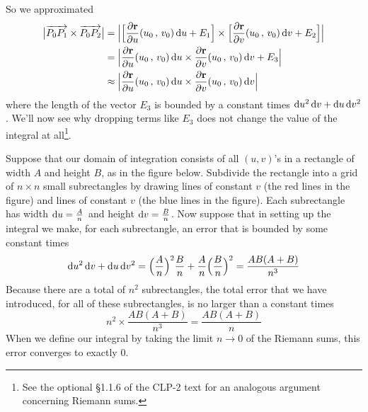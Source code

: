 So we approximated
\begin{align*}
\big|\overrightarrow{P_0P_1}\times\overrightarrow{P_0P_2}\big|
&=\Big|\Big[\frac{\partial\mathbf{r}}{\partial u}(u_0\,,\,v_0)\,\mathrm{d}u + E_1\Big]
\times\Big[\frac{\partial\mathbf{r}}{\partial v}(u_0\,,\,v_0)\,\mathrm{d}v + E_2\Big]
\Big| \\
&=\Big|\frac{\partial\mathbf{r}}{\partial u}(u_0\,,\,v_0)\,\mathrm{d}u 
\times\frac{\partial\mathbf{r}}{\partial v}(u_0\,,\,v_0)\,\mathrm{d}v + E_3
\Big| \\
&\approx \Big|\frac{\partial\mathbf{r}}{\partial u}(u_0\,,\,v_0)\,\mathrm{d}u 
\times\frac{\partial\mathbf{r}}{\partial v}(u_0\,,\,v_0)\,\mathrm{d}v
\Big|
\end{align*}
where the length of the vector $E_3$ is bounded by a constant times 
$\mathrm{d}u^2\,\mathrm{d}v+\mathrm{d}u\,\mathrm{d}v^2$.
We'll now see why dropping terms like $E_3$ does not change the value
of the integral at all\footnote{See the optional \S 1.1.6 of the CLP-2 text
for an analogous argument concerning Riemann sums.}. 

Suppose that our domain of integration consists of all $(u,v)$'s 
in a rectangle of width $A$ and height $B$, as in the figure below.
Subdivide the rectangle into a grid of $n\times n$ small subrectangles 
by drawing lines of constant $v$ (the red lines in the figure) and 
lines of constant $v$ (the blue lines in the figure).
Each subrectangle has width $\mathrm{d}u = \frac{A}{n}$ and height
$\mathrm{d}v = \frac{B}{n}$. Now suppose that in setting up the integral 
we make, for each subrectangle, an error that is bounded by some constant
times
\begin{equation*}
\mathrm{d}u^2\,\mathrm{d}v+\mathrm{d}u\,\mathrm{d}v^2
=\Big(\frac{A}{n}\Big)^2 \frac{B}{n}
 +  \frac{A}{n}\Big(\frac{B}{n}\Big)^2
=\frac{AB(A+B)}{n^3}
\end{equation*}
Because there are a total of $n^2$ subrectangles, the total error that 
we have introduced, for all of these subrectangles, is no larger than 
a constant times
\begin{equation*}
n^2 \times \frac{AB(A+B)}{n^3} = \frac{AB(A+B)}{n}
\end{equation*}
When we define our integral by taking the limit $n\rightarrow 0$ of 
the Riemann sums, this error converges to exactly $0$.


